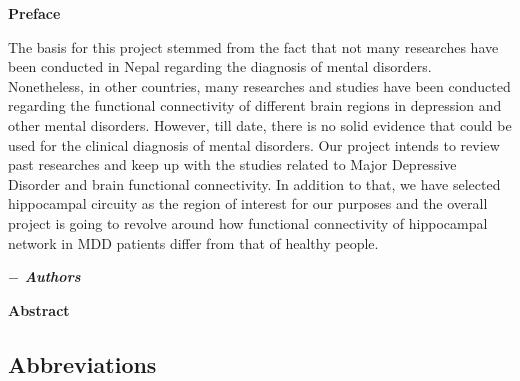 \documentclass[12pt]{article}
\begin{document}


\clearpage
\setcounter{page}{1}
\hskip180pt {\textbf{\centering \Large Preface} }
\vskip40pt

\noindent
The basis for this project stemmed from the fact that not many
researches have been conducted in Nepal regarding the diagnosis of
mental disorders. Nonetheless, in other countries, many researches and
studies have been conducted regarding the functional connectivity of
different brain regions in depression and other mental
disorders. However, till date, there is no solid evidence that could
be used for the clinical diagnosis of mental disorders. Our project
intends to review past researches and keep up with the studies related
to Major Depressive Disorder and brain functional connectivity. In
addition to that, we have selected hippocampal circuity as the region
of interest for our purposes and the overall project is going to
revolve around how functional connectivity of hippocampal network in
MDD patients differ from that of healthy people.

\hspace*{133mm}\textbf{\textit {$-$ Authors}}
\newpage

\hskip180pt {\textbf{\centering \Large Abstract} }
\vskip2pt

\newpage

\thispagestyle{empty}
\listoffigures

\thispagestyle{empty}
\listoftables
\newpage


\begin{center}
  \section*{Abbreviations}
\end{center}

\begin{acronym}
\end{acronym}
\end{document}
